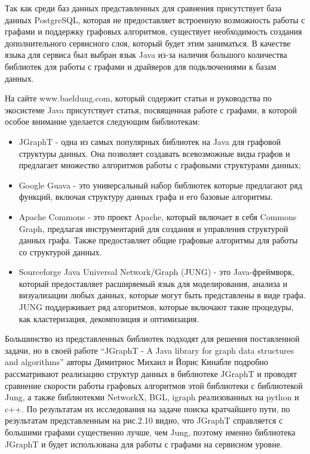 Так как среди баз данных представленных для сравнения присутствует база данных PostgreSQL, которая не предоставляет встроенную возможность
работы с графами и поддержку графовых алгоритмов, существует необходимость создания дополнительного сервисного слоя, который будет этим
заниматься. В качестве языка для сервиса был выбран язык Java из-за наличия большого количества библиотек для работы с графами и драйверов
для подключениями к базам данных.

На сайте www.baeldung.com, который содержит статьи и руководства по экосистеме Java присутствует статья, посвященная работе с графами, в
которой особое внимание уделается следующим библиотекам:

\begin{itemize}
    \item JGraphT - одна из самых популярных библиотек на Java для графовой структуры данных. Она позволяет создавать всевозможные виды графов и предлагает множество алгоритмов работы с графовыми структурами данных;
    \item Google Guava - это универсальный набор библиотек которые предлагают ряд функций, включая структуру данных графа и его базовые алгоритмы.
    \item Apache Commons - это проект Apache, который включает в себя Commons Graph, предлагая инструментарий для создания и управления структурой данных графа. Также предоставляет общие графовые алгоритмы для работы со структурой данных.
    \item Sourceforge Java Universal Network/Graph (JUNG) - это Java-фреймворк, который предоставляет расширяемый язык для моделирования, анализа и визуализации любых данных, которые могут быть представлены в виде графа. JUNG поддерживает ряд алгоритмов, которые включают такие процедуры, как кластеризация, декомпозиция и оптимизация.
\end{itemize}

Большинство из представленных библиотек подходят для решения поставленной задачи, но в своей работе “JGraphT - A Java library for graph
data structures and algorithms” авторы Димитриос Михаил и Йорис Кинабле подробно рассматривают реализацию структур данных в библиотеке
JGraphT и проводят сравнение скорости работы графовых алгоритмов этой библиотеки с библиотекой Jung, а также библиотекми NetworkX, BGL,
igraph реализованных на python и c++. По результатам их исследования на задаче поиска кратчайшего пути, по результатам представленным
на рис.2.10 видно, что JGraphT справляется с большими графами существенно лучше, чем Jung, поэтому именно библиотека JGraphT и будет
использована для работы с графами на сервисном уровне.

